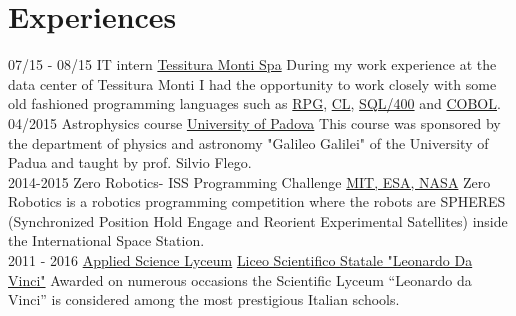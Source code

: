 \documentclass[]{friggeri-cv}
\begin{document}
\section{Experiences}
    \begin{entrylist} 
     \entry
    {07/15 - 08/15}
    {IT intern}
    {\href{http://www.monti.it/en_eu/}{Tessitura Monti Spa}}
    {During my work experience at the data center of Tessitura Monti I had the opportunity to work closely with some old fashioned programming languages such as \href{https://goo.gl/R4Tezc}{RPG}, \href{https://goo.gl/RsCpyU}{CL}, \href{https://goo.gl/T9cKu4}{SQL/400} and \href{https://goo.gl/Xs0BJz}{COBOL}.\\}
    \entry
    {04/2015}
    {Astrophysics course}
    {\href{http://www.dfa.unipd.it/}{University of Padova}}
    {This course was sponsored by the department of physics and astronomy "Galileo Galilei" of the University of Padua and taught by prof. Silvio Flego. \\} 
    \entry
    {2014-2015}
    {Zero Robotics- ISS Programming Challenge}
    { \href{http://zerorobotics.mit.edu/}{MIT, ESA, NASA}}
    {Zero Robotics is a robotics programming competition where the robots are SPHERES (Synchronized Position Hold Engage and Reorient Experimental Satellites) inside the International Space Station.\\}
    \entry
    {2011 - 2016}
    {\href{https://1drv.ms/b/s!Ap_mQ71ue930qnSZIBbkjV82or3Z}{Applied Science Lyceum}}
    { \href{http://www.liceodavinci.tv/sitoLiceo/index.php/}{Liceo Scientifico Statale "Leonardo Da Vinci"}}
    {Awarded on numerous occasions the Scientific Lyceum “Leonardo da Vinci” is considered among the most prestigious Italian schools.}
\end{entrylist}
\end{document}

